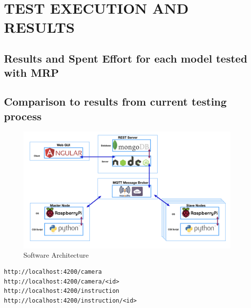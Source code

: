 \chapter{TEST EXECUTION AND RESULTS}
\label{chapter:testing_results}



\section{Results and Spent Effort for each model tested with MRP}

\section{Comparison to results from current testing process}


\begin{figure} [htbp!]
	\centering
					\includegraphics[width=1.1\textwidth]{figures/software_architecture.jpeg}
					\caption{\label{Fig:software_architecture} Software Architecture}
\end{figure}


\begin{lstlisting}
http://localhost:4200/camera
http://localhost:4200/camera/<id>
http://localhost:4200/instruction
http://localhost:4200/instruction/<id>
\end{lstlisting}

